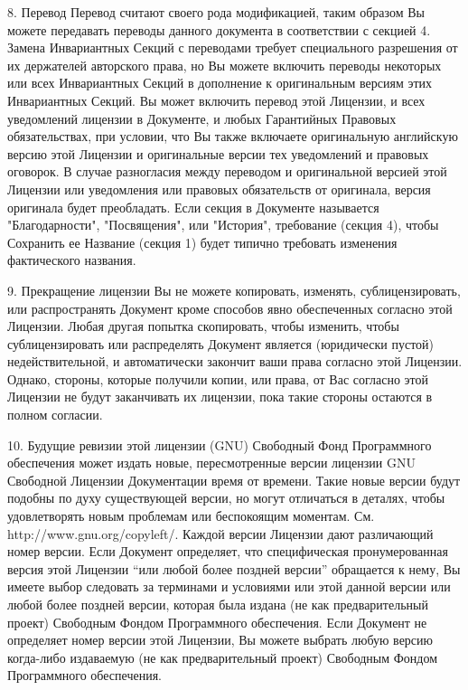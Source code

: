 8. Перевод 
Перевод считают своего рода модификацией, таким образом Вы можете передавать переводы данного документа в соответствии
 с секцией 4. Замена Инвариантных Секций с переводами требует специального разрешения от их держателей авторского права,
 но Вы можете включить переводы некоторых или всех Инвариантных Секций в дополнение к оригинальным версиям этих
 Инвариантных Секций. Вы может включить перевод этой Лицензии, и всех уведомлений лицензии в Документе, и любых
 Гарантийных Правовых обязательствах, при условии, что Вы также включаете оригинальную английскую версию этой Лицензии
 и оригинальные версии тех уведомлений и правовых оговорок. В случае разногласия между переводом и оригинальной версией
 этой Лицензии или уведомления или правовых обязательств от оригинала, версия оригинала будет преобладать.
Если секция в Документе называется "Благодарности", "Посвящения", или "История", требование (секция 4), чтобы Сохранить
 ее Название (секция 1) будет типично требовать изменения фактического названия.

9. Прекращение лицензии
Вы не можете копировать, изменять, сублицензировать, или распространять Документ кроме способов явно обеспеченных
 согласно этой Лицензии. Любая другая попытка скопировать, чтобы изменить, чтобы сублицензировать или распределять
 Документ является (юридически пустой) недействительной, и автоматически закончит ваши права согласно этой Лицензии.
 Однако, стороны, которые получили копии, или права, от Вас согласно этой Лицензии не будут заканчивать их лицензии,
 пока такие стороны остаются в полном согласии.

10. Будущие ревизии этой лицензии (GNU)
Свободный Фонд Программного обеспечения может издать новые, пересмотренные версии лицензии GNU Свободной Лицензии
 Документации время от времени. Такие новые версии будут подобны по духу существующей версии, но могут отличаться
 в деталях, чтобы удовлетворять новым проблемам или беспокоящим моментам. См. http://www.gnu.org/copyleft/.
Каждой версии Лицензии дают различающий номер версии. Если Документ определяет, что специфическая пронумерованная
 версия этой Лицензии “или любой более поздней версии” обращается к нему, Вы имеете выбор следовать за терминами и
 условиями или этой данной версии или любой более поздней версии, которая была издана (не как предварительный проект)
 Свободным Фондом Программного обеспечения. Если Документ не определяет номер версии этой Лицензии, Вы можете выбрать 
любую версию когда-либо издаваемую (не как предварительный проект) Свободным Фондом Программного обеспечения.